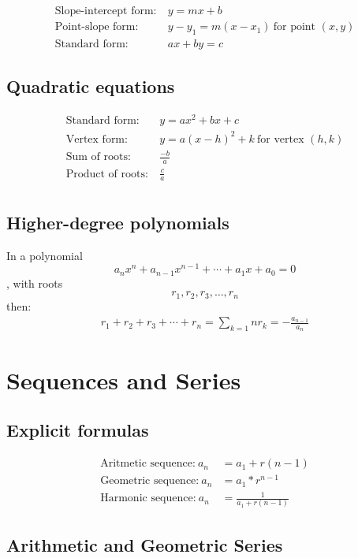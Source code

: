 \[\begin{aligned}
	\text{Slope-intercept form:}&~y = mx + b \\
	\text{Point-slope form:}&~y - y_1 = m(x - x_1)~\text{for point $(x, y)$} \\
	\text{Standard form:}&~ax + by = c
\end{aligned}\]


\subsection{Quadratic equations}

\[\begin{aligned}
	\text{Standard form:}&~y = ax^2 + bx + c \\
	\text{Vertex form:}&~y = a(x-h)^2 + k~\text{for vertex $(h, k)$} \\
	\text{Sum of roots:}&~\frac{-b}{a} \\
	\text{Product of roots:}&~\frac{c}{a} \\
\end{aligned}\]

\subsection{Higher-degree polynomials}
In a polynomial
\[
	a_n x^n + a_{n-1} x^{n-1} + \dotsb + a_1 x + a_0 = 0
\]
, with roots
\[
	r_1, r_2, r_3, \dotsc , r_n
\]
then:
\[\begin{aligned}
	r_1 + r_2 + r_3 + \dotsb + r_n = \sum_{k=1}{n} r_k = -\frac{a_{n-1}}{a_n}
\end{aligned}\]

\columnbreak


\section{Sequences and Series}

\subsection{Explicit formulas}
\[\begin{aligned}
	\text{Aritmetic sequence:}~a_n &= a_1 + r(n - 1) \\
	\text{Geometric sequence:}~a_n &= a_1 * r^{n - 1} \\
	\text{Harmonic sequence:}~a_n &= \frac{1}{a_1 + r(n - 1)}
\end{aligned}\]

\subsection{Arithmetic and Geometric Series}

